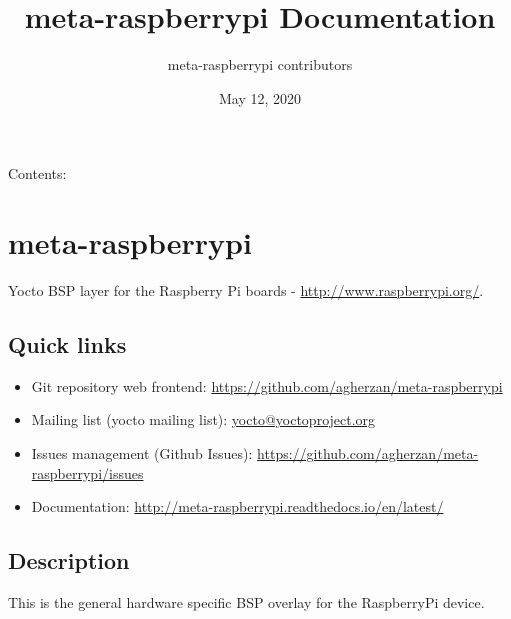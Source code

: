 \documentclass[letterpaper,10pt,english]{sphinxmanual}
\title{meta-raspberrypi Documentation}
\date{May 12, 2020}
\author{meta-raspberrypi contributors}
\begin{document}
\maketitle
\tableofcontents
{}\label{index::doc}


Contents:


\chapter{meta-raspberrypi}
\label{readme:welcome-to-meta-raspberrypi-s-documentation}\label{readme:meta-raspberrypi}\label{readme::doc}
Yocto BSP layer for the Raspberry Pi boards - \href{http://www.raspberrypi.org/}{http://www.raspberrypi.org/}.

\href{https://yocto-ci.resin.io/job/meta-raspberrypi1}{}
\href{https://yocto-ci.resin.io/job/meta-raspberrypi2}{}
\href{https://yocto-ci.resin.io/job/meta-raspberrypi3}{}
\href{https://yocto-ci.resin.io/job/meta-raspberrypi4}{}
\href{https://meta-raspberrypi.readthedocs.io/en/latest/?badge=latest}{}
\href{https://matrix.to/\#/\#meta-raspberrypi:cub.icu}{}


\section{Quick links}
\label{readme:quick-links}\begin{itemize}
\item {} 
Git repository web frontend:
\href{https://github.com/agherzan/meta-raspberrypi}{https://github.com/agherzan/meta-raspberrypi}

\item {} 
Mailing list (yocto mailing list): \href{mailto:yocto@yoctoproject.org}{yocto@yoctoproject.org}

\item {} 
Issues management (Github Issues):
\href{https://github.com/agherzan/meta-raspberrypi/issues}{https://github.com/agherzan/meta-raspberrypi/issues}

\item {} 
Documentation: \href{http://meta-raspberrypi.readthedocs.io/en/latest/}{http://meta-raspberrypi.readthedocs.io/en/latest/}

\end{itemize}


\section{Description}
\label{readme:description}
This is the general hardware specific BSP overlay for the RaspberryPi device.
\end{document}
